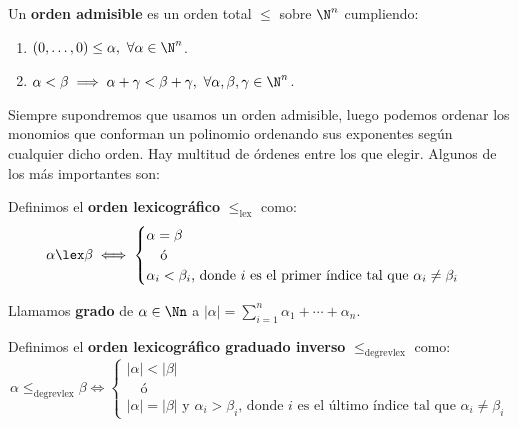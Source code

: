 \begin{definicion}
    Un \textbf{orden admisible} es un orden total $\le$ sobre $\N^n$ cumpliendo:
    \begin{enumerate}
        \item $(0,\dots ,0) \le \alpha,\ \forall \alpha \in \N^n$.
        \item $\alpha < \beta \implies \alpha + \gamma < \beta + \gamma,\ \forall \alpha,\beta,\gamma \in \N^n$.
    \end{enumerate}
\end{definicion}

Siempre supondremos que usamos un orden admisible, luego podemos ordenar los monomios que conforman un polinomio ordenando sus exponentes según cualquier dicho orden. Hay multitud de órdenes entre los que elegir. Algunos de los más importantes son:

\begin{ejemplo}
    Definimos el \textbf{orden lexicográfico} $\le_{\text{lex}}$ como:
    \begin{equation*}
        \alpha \lex \beta \iff \begin{cases}
            \alpha  = \beta \\
            \quad\text{ó}   \\
            \alpha_i < \beta_i \text{, donde $i$ es el primer índice tal que } \alpha_i \neq \beta_i
        \end{cases}
    \end{equation*}
\end{ejemplo}

\begin{definicion}
    Llamamos \textbf{grado} de $\alpha\in\Nn$ a $\vert \alpha\vert = \sum_{i=1}^n \alpha_1+\cdots + \alpha_n$.
\end{definicion}
\begin{ejemplo}
    Definimos el \textbf{orden lexicográfico graduado inverso} $\le_{\text{degrevlex}}$ como:
    \begin{equation*}
        \alpha \le_{\text{degrevlex}} \beta \iff \begin{cases}
            |\alpha| < |\beta| \\
            \quad\text{ó}   \\
            |\alpha| = |\beta| \text{ y } \alpha_i > \beta_i \text{, donde $i$ es el último índice tal que } \alpha_i \neq \beta_i
        \end{cases}
    \end{equation*}
\end{ejemplo}

